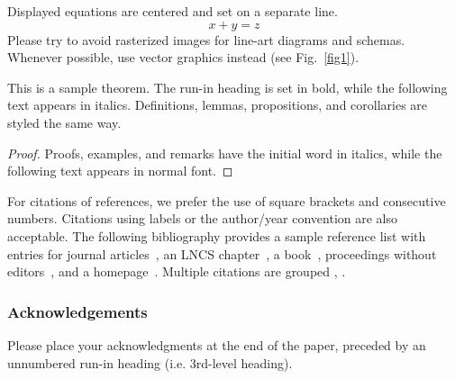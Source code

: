 \documentclass[runningheads]{llncs}
\begin{document}
\noindent Displayed equations are centered and set on a separate
line.
\begin{equation}
x + y = z
\end{equation}
Please try to avoid rasterized images for line-art diagrams and
schemas. Whenever possible, use vector graphics instead (see
Fig.~\ref{fig1}).


\begin{theorem}
This is a sample theorem. The run-in heading is set in bold, while
the following text appears in italics. Definitions, lemmas,
propositions, and corollaries are styled the same way.
\end{theorem}
%
%
\begin{proof}
Proofs, examples, and remarks have the initial word in italics,
while the following text appears in normal font.
\end{proof}
For citations of references, we prefer the use of square brackets
and consecutive numbers. Citations using labels or the author/year
convention are also acceptable. The following bibliography provides
a sample reference list with entries for journal
articles~\cite{ref_article1}, an LNCS chapter~\cite{ref_lncs1}, a
book~\cite{ref_book1}, proceedings without editors~\cite{ref_proc1},
and a homepage~\cite{ref_url1}. Multiple citations are grouped
\cite{ref_article1,ref_lncs1,ref_book1},
\cite{ref_article1,ref_book1,ref_proc1,ref_url1}.

\subsubsection{Acknowledgements} Please place your acknowledgments at
the end of the paper, preceded by an unnumbered run-in heading (i.e.
3rd-level heading).
\end{document}
